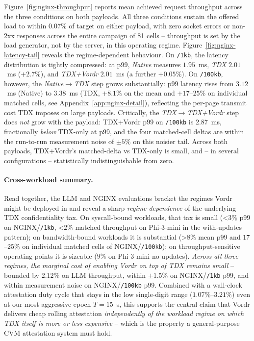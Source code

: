 Figure~\ref{fig:nginx-throughput} reports mean achieved request
throughput across the three conditions on both payloads. All three
conditions sustain the offered load to within $0.07\%$ of target on
either payload, with zero socket errors or non-2xx responses across
the entire campaign of 81 cells -- throughput is set by the load
generator, not by the server, in this operating regime.
Figure~\ref{fig:nginx-latency-tail} reveals the regime-dependent
behaviour. On \texttt{/1kb}, the latency distribution is tightly
compressed: at p99, \emph{Native} measures $1.95$~ms, \emph{TDX}
$2.01$~ms ($+2.7\%$), and \emph{TDX+Vordr} $2.01$~ms (a further
$+0.05\%$). On \texttt{/100kb}, however, the
\emph{Native$\rightarrow$TDX} step grows substantially: p99 latency
rises from $3.12$~ms (Native) to $3.38$~ms (TDX, $+8.1\%$ on the
mean and $+17$--$25\%$ on individual matched cells, see
Appendix~\ref{app:nginx-detail}), reflecting the per-page transmit
cost TDX imposes on large payloads. Critically, the
\emph{TDX$\rightarrow$TDX+Vordr} step does \emph{not} grow with the
payload: TDX+Vordr p99 on \texttt{/100kb} is $2.87$~ms, fractionally
\emph{below} TDX-only at p99, and the four matched-cell deltas are
within the run-to-run measurement noise of $\pm 5\%$ on this noisier
tail. Across both payloads, TDX+Vordr's matched-delta vs TDX-only is
small, and -- in several configurations -- statistically
indistinguishable from zero.

\paragraph{Cross-workload summary.}
Read together, the LLM and NGINX evaluations bracket the regimes
Vordr might be deployed in and reveal a sharp \emph{regime-dependence}
of the underlying TDX confidentiality tax. On
syscall-bound workloads, that tax is small (\textless$3\%$ p99 on
NGINX/\texttt{/1kb}, \textless$2\%$ matched throughput on Phi-3-mini
in the with-updates pattern); on bandwidth-bound workloads it is
substantial (\textgreater$8\%$ mean p99 and $17$--$25\%$ on
individual matched cells of NGINX/\texttt{/100kb}); on
throughput-sensitive operating points it is sizeable
($9\%$ on Phi-3-mini no-updates). \emph{Across all three regimes,
the marginal cost of enabling Vordr on top of TDX remains small
} -- bounded by $2.12\%$ on LLM throughput, within $\pm 1.5\%$
on NGINX/\texttt{/1kb} p99, and within measurement noise on
NGINX/\texttt{/100kb} p99. Combined with a wall-clock attestation
duty cycle that stays in the low single-digit range
($1.07\%$--$3.21\%$) even at our most aggressive epoch
$T{=}15$~s, this supports the central claim that Vordr delivers
cheap rolling attestation \emph{independently of the workload regime
on which TDX itself is more or less expensive} -- which is the
property a general-purpose CVM attestation system must hold.

